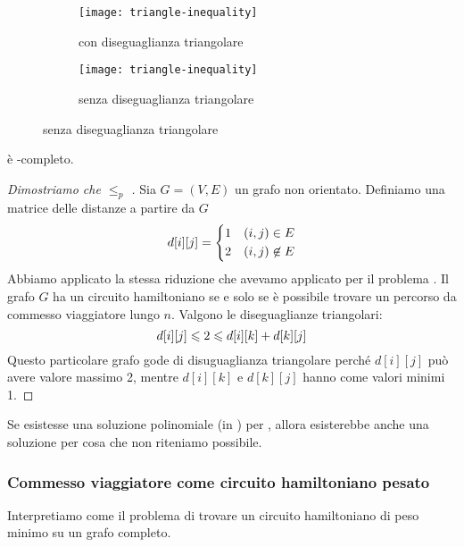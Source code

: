 \begin{figure}[H]
	\begin{subfigure}[t]{.5\linewidth}\centering
		\texttt{[image: triangle-inequality]}
		\caption{con diseguaglianza triangolare}
	\end{subfigure}%
	\begin{subfigure}[t]{.5\linewidth}\centering
		\texttt{[image: triangle-inequality]}
		\caption{senza diseguaglianza triangolare}
	\end{subfigure}
\end{figure}

\begin{note}
{\deltaTsp} è \NP-completo.
\end{note}

\begin{proof}[Dimostriamo che {\hamiltonianCircuit} \(\leqslant_p\) {\deltaTsp}]
Sia \(G = (V, E)\) un grafo non orientato. Definiamo una matrice delle distanze a partire da \(G\)
\[
	d[i][j] =
	\begin{dcases}
		1 & (i,j) \in E\\
		2 & (i,j) \not\in E\\
	\end{dcases}
\]
Abbiamo applicato la stessa riduzione che avevamo applicato per il problema {\tsp}.
Il grafo \(G\) ha un circuito hamiltoniano se e solo se è possibile trovare un percorso da commesso viaggiatore lungo \(n\).
Valgono le diseguaglianze triangolari:
\[
	d[i][j] \leqslant 2 \leqslant d[i][k] + d[k][j]\qedhere
\]
Questo particolare grafo gode di disuguaglianza triangolare perché \(d[i][j]\) può avere valore massimo 2, mentre \(d[i][k]\) e \(d[k][j]\) hanno come valori minimi 1.
\end{proof}

\begin{note}
Se esistesse una soluzione polinomiale (in {\PTIME}) per {\deltaTsp}, allora esisterebbe anche una soluzione per {\hamiltonianCircuit} cosa che non riteniamo possibile.
\end{note}

\subsubsection{Commesso viaggiatore come circuito hamiltoniano pesato}

Interpretiamo {\deltaTsp} come il problema di trovare un circuito hamiltoniano di peso minimo su un grafo completo.

